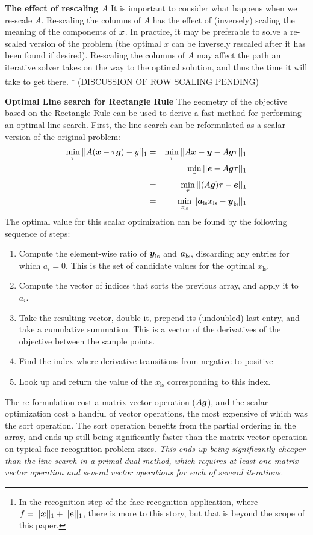 \documentclass[12pt,journal,draftcls,letterpaper,onecolumn]{IEEEtran}
\begin{document}
{\bf The effect of rescaling $A$} It is important to consider what happens when we re-scale $A$.  Re-scaling the columns of $A$ has the effect of (inversely) scaling the meaning of the components of ${\boldsymbol{x}}$.  In practice, it may be preferable to solve a re-scaled version of the problem (the optimal $x$ can be inversely rescaled after it has been found if desired).  Re-scaling the columns of $A$ may affect the path an iterative solver takes on the way to the optimal solution, and thus the time it will take to get there.  \footnote{In the recognition step of the face recognition application, where $f = ||{\boldsymbol{x}}||_1 + ||\boldsymbol{e}||_1$, there is more to this story, but that is beyond the scope of this paper.}  (DISCUSSION OF ROW SCALING PENDING)

{\bf Optimal Line search for Rectangle Rule} The geometry of the objective based on the Rectangle Rule can be used to derive a fast method for performing an optimal line search.  First, the line search can be reformulated as a scalar version of the original problem:
\begin{eqnarray*}
\min_{\tau}{||A ({\boldsymbol{x}} - \tau \boldsymbol{g})-y||_1} &=& \min_{\tau} ||A{\boldsymbol{x}} - {\boldsymbol{y}} - A \boldsymbol{g} \tau||_1 \\
&=& \min_{\tau} ||\boldsymbol{e} - A \boldsymbol{g} \tau||_1 \\
&=& \min_{\tau} ||(A\boldsymbol{g}) \tau - \boldsymbol{e}||_1 \\
&=& \min_{x_{\textrm{ls}}} ||\boldsymbol{a}_{\textrm{ls}} x_{\textrm{ls}} - {\boldsymbol{y}}_{\textrm{ls}}||_1
\end{eqnarray*}
The optimal value for this scalar optimization can be found by the following sequence of steps:
\begin{enumerate}
\item Compute the element-wise ratio of ${\boldsymbol{y}}_{\textrm{ls}}$ and $\boldsymbol{a}_{\textrm{ls}}$, discarding any entries for which $a_i = 0$.  This is the set of candidate values for the optimal $x_{\textrm{ls}}$.
\item Compute the vector of indices that sorts the previous array, and apply it to $a_i$.
\item Take the resulting vector, double it, prepend its (undoubled) last entry, and take a cumulative summation.  This is a vector of the derivatives of the objective between the sample points.
\item Find the index where derivative transitions from negative to positive
\item Look up and return the value of the $x_{\textrm{ls}}$ corresponding to this index.
\end{enumerate}
The re-formulation cost a matrix-vector operation ($A\boldsymbol{g}$), and the scalar optimization cost a handful of vector operations, the most expensive of which was the sort operation.  The sort operation benefits from the partial ordering in the array, and ends up still being significantly faster than the matrix-vector operation on typical face recognition problem sizes. {\em This ends up being significantly cheaper than the line search in a primal-dual method, which requires at least one matrix-vector operation and several vector operations for each of several iterations. }
\end{document}
